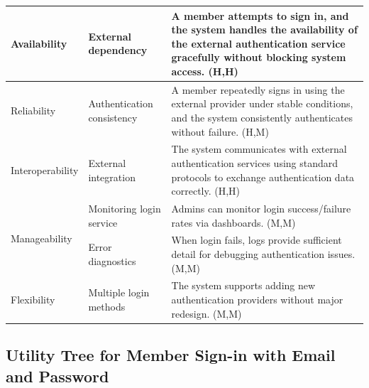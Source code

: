 \documentclass{article}
\begin{document}
\begin{table}[H]
\begin{tabular}{|p{3cm}|p{4cm}|p{7cm}|}
        Availability
                                   & External dependency
                                   & A member attempts to sign in, and the system handles the availability of the external authentication service gracefully without blocking system access. (H,H)                                    \\
        \hline

        Reliability
                                   & Authentication consistency
                                   & A member repeatedly signs in using the external provider under stable conditions, and the system consistently authenticates without failure. (H,M)                                               \\
        \hline

        Interoperability
                                   & External integration
                                   & The system communicates with external authentication services using standard protocols to exchange authentication data correctly. (H,H)                                                          \\
        \hline

        \multirow{2}{*}{Manageability}
                                   & Monitoring login service
                                   & Admins can monitor login success/failure rates via dashboards. (M,M)                                                                                                                             \\
        \cline{2-3}
                                   & Error diagnostics
                                   & When login fails, logs provide sufficient detail for debugging authentication issues. (M,M)                                                                                                      \\
        \hline

        Flexibility
                                   & Multiple login methods
                                   & The system supports adding new authentication providers without major redesign. (M,M)                                                                                                            \\
        \hline
    \end{tabular}
\end{table}

\subsection{Utility Tree for Member Sign-in with Email and Password}
\end{document}
